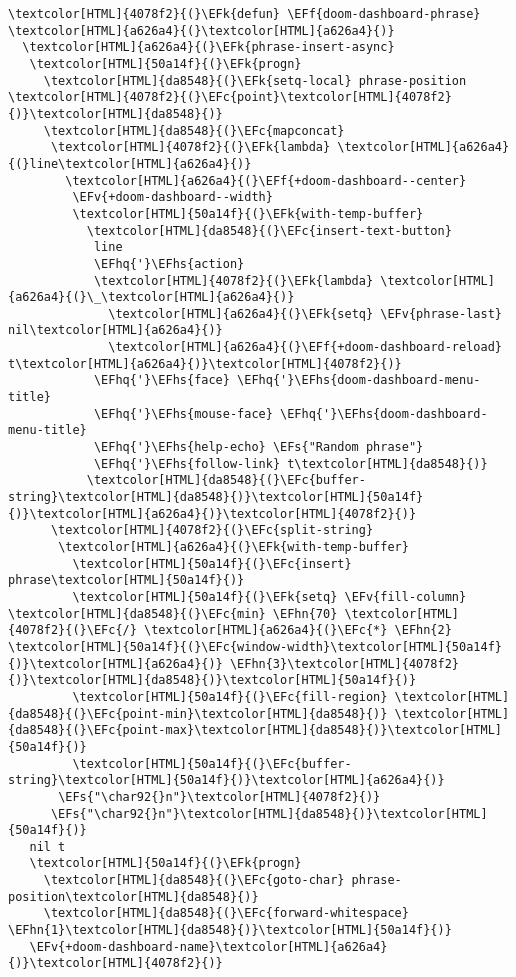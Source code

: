 \documentclass{scrartcl}
\newcommand{\EFk}[1]{\textcolor{EFk}{#1}} %
\newcommand{\EFs}[1]{\textcolor{EFs}{#1}} %
\newcommand{\EFc}[1]{\textcolor{EFc}{#1}} %
\newcommand{\EFv}[1]{\textcolor{EFv}{#1}} %
\newcommand{\EFf}[1]{\textcolor{EFf}{#1}} %
\newcommand{\EFhn}[1]{\textcolor{EFhn}{\textbf{#1}}} %
\newcommand{\EFhq}[1]{\textcolor{EFhq}{#1}} %
\newcommand{\EFhs}[1]{\textcolor{EFhs}{#1}} %
\begin{document}
\begin{Code}
\begin{Verbatim}[]
\textcolor[HTML]{4078f2}{(}\EFk{defun} \EFf{doom-dashboard-phrase} \textcolor[HTML]{a626a4}{(}\textcolor[HTML]{a626a4}{)}
  \textcolor[HTML]{a626a4}{(}\EFk{phrase-insert-async}
   \textcolor[HTML]{50a14f}{(}\EFk{progn}
     \textcolor[HTML]{da8548}{(}\EFk{setq-local} phrase-position \textcolor[HTML]{4078f2}{(}\EFc{point}\textcolor[HTML]{4078f2}{)}\textcolor[HTML]{da8548}{)}
     \textcolor[HTML]{da8548}{(}\EFc{mapconcat}
      \textcolor[HTML]{4078f2}{(}\EFk{lambda} \textcolor[HTML]{a626a4}{(}line\textcolor[HTML]{a626a4}{)}
        \textcolor[HTML]{a626a4}{(}\EFf{+doom-dashboard--center}
         \EFv{+doom-dashboard--width}
         \textcolor[HTML]{50a14f}{(}\EFk{with-temp-buffer}
           \textcolor[HTML]{da8548}{(}\EFc{insert-text-button}
            line
            \EFhq{'}\EFhs{action}
            \textcolor[HTML]{4078f2}{(}\EFk{lambda} \textcolor[HTML]{a626a4}{(}\_\textcolor[HTML]{a626a4}{)}
              \textcolor[HTML]{a626a4}{(}\EFk{setq} \EFv{phrase-last} nil\textcolor[HTML]{a626a4}{)}
              \textcolor[HTML]{a626a4}{(}\EFf{+doom-dashboard-reload} t\textcolor[HTML]{a626a4}{)}\textcolor[HTML]{4078f2}{)}
            \EFhq{'}\EFhs{face} \EFhq{'}\EFhs{doom-dashboard-menu-title}
            \EFhq{'}\EFhs{mouse-face} \EFhq{'}\EFhs{doom-dashboard-menu-title}
            \EFhq{'}\EFhs{help-echo} \EFs{"Random phrase"}
            \EFhq{'}\EFhs{follow-link} t\textcolor[HTML]{da8548}{)}
           \textcolor[HTML]{da8548}{(}\EFc{buffer-string}\textcolor[HTML]{da8548}{)}\textcolor[HTML]{50a14f}{)}\textcolor[HTML]{a626a4}{)}\textcolor[HTML]{4078f2}{)}
      \textcolor[HTML]{4078f2}{(}\EFc{split-string}
       \textcolor[HTML]{a626a4}{(}\EFk{with-temp-buffer}
         \textcolor[HTML]{50a14f}{(}\EFc{insert} phrase\textcolor[HTML]{50a14f}{)}
         \textcolor[HTML]{50a14f}{(}\EFk{setq} \EFv{fill-column} \textcolor[HTML]{da8548}{(}\EFc{min} \EFhn{70} \textcolor[HTML]{4078f2}{(}\EFc{/} \textcolor[HTML]{a626a4}{(}\EFc{*} \EFhn{2} \textcolor[HTML]{50a14f}{(}\EFc{window-width}\textcolor[HTML]{50a14f}{)}\textcolor[HTML]{a626a4}{)} \EFhn{3}\textcolor[HTML]{4078f2}{)}\textcolor[HTML]{da8548}{)}\textcolor[HTML]{50a14f}{)}
         \textcolor[HTML]{50a14f}{(}\EFc{fill-region} \textcolor[HTML]{da8548}{(}\EFc{point-min}\textcolor[HTML]{da8548}{)} \textcolor[HTML]{da8548}{(}\EFc{point-max}\textcolor[HTML]{da8548}{)}\textcolor[HTML]{50a14f}{)}
         \textcolor[HTML]{50a14f}{(}\EFc{buffer-string}\textcolor[HTML]{50a14f}{)}\textcolor[HTML]{a626a4}{)}
       \EFs{"\char92{}n"}\textcolor[HTML]{4078f2}{)}
      \EFs{"\char92{}n"}\textcolor[HTML]{da8548}{)}\textcolor[HTML]{50a14f}{)}
   nil t
   \textcolor[HTML]{50a14f}{(}\EFk{progn}
     \textcolor[HTML]{da8548}{(}\EFc{goto-char} phrase-position\textcolor[HTML]{da8548}{)}
     \textcolor[HTML]{da8548}{(}\EFc{forward-whitespace} \EFhn{1}\textcolor[HTML]{da8548}{)}\textcolor[HTML]{50a14f}{)}
   \EFv{+doom-dashboard-name}\textcolor[HTML]{a626a4}{)}\textcolor[HTML]{4078f2}{)}


\end{Verbatim}
\end{Code}
\end{document}
